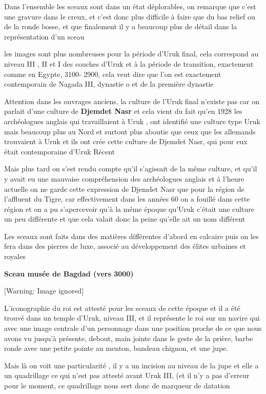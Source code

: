 \documentclass[a4paper,10pt]{article}
\begin{document}
\begin{itemize}
Dans l'ensemble les sceaux sont dans un état
déplorables, on remarque que c'est une gravure dans le
creux, et c'est donc plus difficile à faire que du bas
relief ou de la ronde bosse, et que finalement il y a beaucoup plus de
détail dans la représentation d'un sceau

les images sont plus nombreuses pour la période d'Uruk
final, cela correspond au niveau III , II et I des couches
d'Uruk et à la période de transition, exactement comme
en Egypte, 3100- 2900, cela veut dire que l'on est
exactement contemporain de Nagada III, dynastie o et de la première
dynastie

Attention dans les ouvrages anciens, la culture de
l'Uruk final n'existe pas car on
parlait d'une culture de \textbf{Djemdet Nasr} et cela
vient du fait qu'en 1928 les archéologues anglais qui
travaillaient à Uruk , ont identifié une culture type Uruk mais
beaucoup plus au Nord et surtout plus aboutie que ceux que les
allemands trouvaient à Uruk et ils ont crée cette culture de Djemdet
Nasr, qui pour eux était contemporaine d'Uruk Récent

Mais plus tard on s'est rendu compte
qu'il s'agissait de la même culture,
et qu'il y avait eu une mauvaise compréhension des
archéologues anglais et à l'heure actuelle on ne garde
cette expression de Djemdet Nasr que pour la région de
l'affluent du Tigre, car effectivement dans les années
60  on a fouillé dans cette région et on a pu
s'apercevoir qu'à la même époque
qu'Uruk c'était une culture un peu
différente et que cela valait donc la peine qu'elle
ait un nom différent

Les sceaux sont faits dans des matières différentes
d'abord en calcaire puis on les fera dans des pierres
de luxe, associé  au développement des élites urbaines et royales

\textbf{Sceau musée de Bagdad  (vers 3000)}

  [Warning: Image ignored] %
 

L'iconographie du roi est attesté pour les sceaux de
cette époque  et il a été trouvé dans un temple
d'Uruk, niveau III, et il représente le roi sur un
navire qui avec une image centrale d'un personnage
dans une position proche de ce que nous avons vu
jusqu'à présente, debout, main jointe dans le geste de
la prière, barbe ronde avec une petite pointe au menton,  bandeau
chignon, et une jupe.

Mais là on voit une particularité , il y a un incision au niveau de la
jupe et elle a un quadrillage ce qui n'est pas attesté
avant Uruk III, (et il n'y a pas
d'erreur pour le moment, ce quadrillage nous sert donc
de marqueur de datation


\end{itemize}
\end{document}
